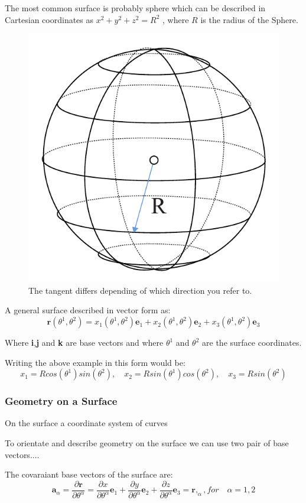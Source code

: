 The most common surface is probably sphere which can be described in Cartesian coordinates as $ x^2 + y^2 + z^2 = R^2$ , where $R$ is the radius of the Sphere.

\begin{figure}[H]
\centering
\includegraphics[width=0.4\linewidth ]{figure/Theory/sphereEx.pdf}                \caption{The tangent differs depending of which direction you refer to. }
\end{figure}

A general surface described in vector form as:
\begin{equation}
\textbf{r}(\theta^1,\theta^2) = x_1(\theta^1,\theta^2)\textbf{e}_1 +  x_2(\theta^1,\theta^2)\textbf{e}_2+  x_3(\theta^1,\theta^2)\textbf{e}_3
\end{equation}

Where \textbf{i},\textbf{j} and \textbf{k} are base vectors and where $\theta^1$ and $\theta^2$ are the surface coordinates.



Writing the above example in this form would be:
\begin{equation}
x_1 = R cos(\theta^1) sin (\theta^2),\quad
x_2 = R  sin(\theta^1) cos (\theta^2),\quad
x_3 = R sin(\theta^2)
\end{equation}

\subsubsection{Geometry on a Surface}

On the surface a coordinate system of curves

To orientate and describe geometry on the surface we can use two pair of base vectors....

The covaraiant base vectors of the surface are:
\begin{equation} \label{convariantDiff}
 \textbf{a}_\alpha = \frac{\partial\textbf{r}}{\partial \theta^\alpha } = \frac{\partial x}{\partial \theta^\alpha }\textbf{e}_1 + \frac{\partial y}{\partial \theta^\alpha }\textbf{e}_2+\frac{\partial z}{\partial \theta^\alpha }\textbf{e}_3 = \textbf{r},_{\alpha} , for\quad \alpha = 1,2
\end{equation}


